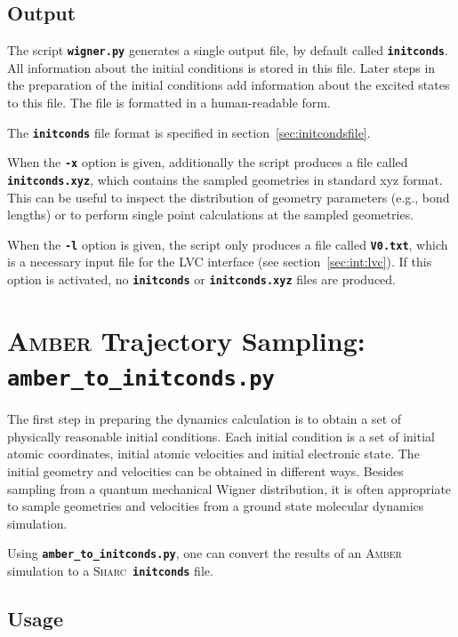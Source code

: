 \documentclass[a4paper,10pt,DIV=15,openany,twoside=false]{scrbook}
\newcommand{\sharc}{\textsc{Sharc}}
\newcommand{\ttt}[1]{\textbf{\texttt{#1}}}
\begin{document}
\subsection{Output}

The script \ttt{wigner.py} generates a single output file, by default called \ttt{initconds}. All information about the initial conditions is stored in this file. Later steps in the preparation of the initial conditions add information about the excited states to this file. The file is formatted in a human-readable form.

The \ttt{initconds} file format is specified in section~\ref{sec:initcondsfile}.

When the \ttt{-x} option is given, additionally the script produces a file called \ttt{initconds.xyz}, which contains the sampled geometries in standard xyz format. This can be useful to inspect the distribution of geometry parameters (e.g., bond lengths) or to perform single point calculations at the sampled geometries.

When the \ttt{-l} option is given, the script only produces a file called \ttt{V0.txt}, which is a necessary input file for the LVC interface (see section~\ref{sec:int:lvc}). If this option is activated, no \ttt{initconds} or \ttt{initconds.xyz} files are produced.




\section{\textsc{Amber} Trajectory Sampling: \ttt{amber\_to\_initconds.py}}\label{sec:amber_to_initconds.py}

The first step in preparing the dynamics calculation is to obtain a set of physically reasonable initial conditions. Each initial condition is a set of initial atomic coordinates, initial atomic velocities and initial electronic state. The initial geometry and velocities can be obtained in different ways. 
Besides sampling from a quantum mechanical Wigner distribution, it is often appropriate to sample geometries and velocities from a ground state molecular dynamics simulation.

Using \ttt{amber\_to\_initconds.py}, one can convert the results of an \textsc{Amber} simulation to a \sharc\ \ttt{initconds} file.

\subsection{Usage}
\end{document}
